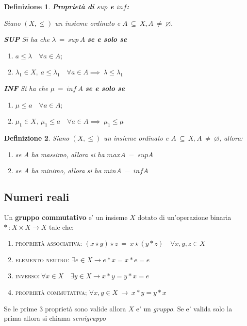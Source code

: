 \documentclass[12pt, a4paper]{article}
\theoremstyle{break}
\newtheorem{defn}{Definizione}
\theoremstyle{lemma}
\theoremstyle{lemma}
\theoremstyle{lemma}
\begin{document}
\begin{defn} \textbf{Proprietà di $sup$ e $inf$:}

		Siano $(X,\leq)$ un insieme ordinato e $A\ \subseteq\ X, A\ \neq\ \varnothing $.

                \textbf{SUP} Si ha che $\lambda\ =\ sup\ A$ \textbf{se e solo se}
		\begin{enumerate}
			\item $a \leq \lambda \quad \forall a \in A;$
			\item $\lambda_1 \in X,\ a \leq \lambda_1 \quad \forall a \in A \implies\  \lambda \leq \lambda_1$
		\end{enumerate}

                
                \textbf{INF} Si ha che $\mu\ =\ inf\ A$ \textbf{se e solo se}
		\begin{enumerate}
			\item $\mu \leq a \quad \forall a \in A;$
			\item $\mu_1 \in X,\ \mu_1 \leq a \quad \forall a \in A \implies\  \mu_1 \leq \mu $
		\end{enumerate}

\end{defn}

\begin{defn} Siano $(X,\leq)$ un insieme ordinato e $A\ \subseteq\ X, A\ \neq\ \varnothing $, allora:
	\begin{enumerate}
		\item se $A$ ha massimo, allora si ha $max A\ =\ sup A$
		\item se $A$ ha minimo, allora si ha $min A\ =\ inf A$
	\end{enumerate}
\end{defn}

\subsection{Numeri reali}
Un \textbf{gruppo commutativo} e' un insieme $X$ dotato di un'operazione binaria $*\ : X \times X \rightarrow X$ tale che:

\begin{enumerate} 
	\item \textsc{proprietà associativa:} $(x \star y) \star z\ =\ x \star (y * z) \quad \forall x,y,z \in X$
	\item \textsc{elemento neutro:} $ \exists e \in X \rightarrow e * x = x * e = e$
	\item \textsc{inverso:}$\ \forall x \in X \quad \exists y \in X \rightarrow x * y = y * x = e$
	\item \textsc{proprietà commutativa;} $ \forall x, y \in X\ \rightarrow \ x * y = y * x$
\end{enumerate}
Se le prime 3 proprietà sono valide allora $X$ e' un \textit{gruppo}. Se e' valida solo la prima allora si chiama \textit{semigruppo}
\end{document}
